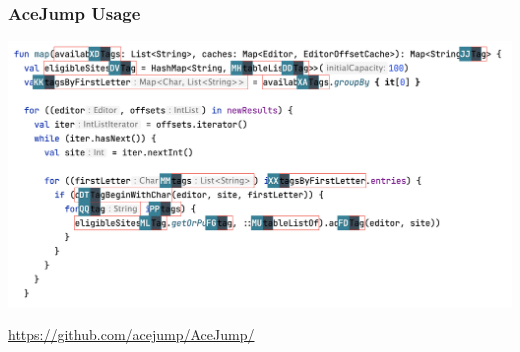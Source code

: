 \documentclass[mathserif,notheorems]{beamer}
\theoremstyle{plain} %
\theoremstyle{definition} %
\begin{document}
\begin{frame}
  \frametitle{AceJump Usage}
  \includegraphics[scale=0.25]{acejump_screenshot}
  \begin{center}\url{https://github.com/acejump/AceJump/}\end{center}
\end{frame}

\end{document}
